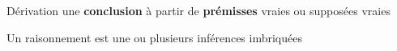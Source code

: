 



%
% 
%
%
%
%
%

%
%	
%
%
%
%
%
%

%
%	
%
%
%
%


\begin{frame}
	
	\begin{description}[labelindent=6pt,style=multiline,leftmargin=1.3in]
		 \setlength\itemsep{1.4em}	

		\item[définition] Dérivation une \textbf{conclusion} à partir de \textbf{prémisses} vraies \pause ou supposées vraies \pause

	\item[Remarque] Un raisonnement est une ou plusieurs inférences imbriquées
	
	\end{description}
\end{frame}


